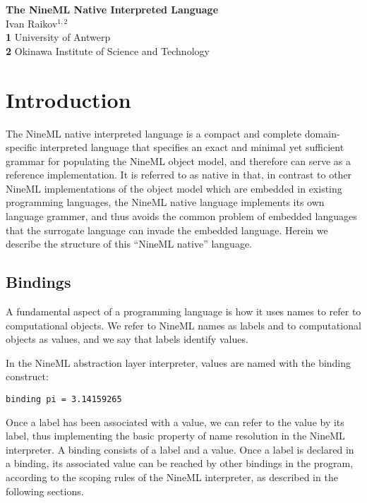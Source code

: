 \documentclass[10pt]{article}
\date{}
\begin{document}
\begin{flushleft}

{\Large
{\textbf{The NineML Native Interpreted Language}}\\

}
Ivan Raikov$^{1,2}$
\\
{\textbf{1}} {University of Antwerp}\\
{\textbf{2}} {Okinawa Institute of Science and Technology}\\
\end{flushleft}


\section*{Introduction}
The NineML native interpreted language is a compact and
complete domain-specific interpreted language that specifies an exact
and minimal yet sufficient grammar for populating the NineML object
model, and therefore can serve as a reference implementation.  It is
referred to as native in that, in contrast to other NineML
implementations of the object model which are embedded in existing
programming languages, the NineML native language implements its own
language grammer, and thus avoids the common problem of embedded
languages that the surrogate language can invade the embedded
language.  Herein we describe the structure of this ``NineML native''
language. 

\subsection*{Bindings}
A fundamental aspect of a programming language is how it uses
names to refer to computational objects.  We refer to NineML names as
labels and to computational objects as values, and we say that labels
identify values. 

In the NineML abstraction layer interpreter, values are named
with the binding construct: \begin{center}
{\small{}\begin{verbatim}
binding pi = 3.14159265
\end{verbatim}
}\end{center}


Once a label has been associated with a value, we can refer to the
value by its label, thus implementing the basic property of name
resolution in the NineML interpreter. A binding consists of a label
and a value. Once a label is declared in a binding, its associated
value can be reached by other bindings in the program, according to
the scoping rules of the NineML interpreter, as described in the
following sections. 
\end{document}
